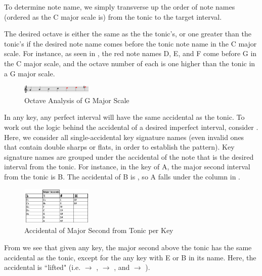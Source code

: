 \documentclass{article}
\begin{document}
To determine note name, we simply transverse up the order of note names (ordered as the C major scale is) from the tonic to the target interval. 

The desired octave is either the same as the the tonic's, or one greater than the tonic's if the desired note name comes before the tonic note name in the C major scale. For instance, as seen in , the red note names D, E, and F come before G in the C major scale, and the octave number of each is one higher than the tonic in a G major scale. 

\vspace{-2mm}
\begin{figure}[h!]
\centering
\includegraphics[width=0.3\textwidth]{images/note_octave_logic}
\caption{\centering Octave Analysis of G Major Scale}
\label{note_octaves}
\vspace{-3mm}
\end{figure}

In any key, any perfect interval will have the same accidental as the tonic. To work out the logic behind the accidental of a desired imperfect interval, consider . Here, we consider all single-accidental key signature names (even invalid ones that contain double sharps or flats, in order to establish the pattern).  Key signature names are grouped under the accidental of the note that is the desired interval from the tonic. For instance, in the key of A\musFlat\;, the major second interval from the tonic is B\musFlat. The accidental of B\musFlat\; is \musFlat, so A\musFlat\; falls under the \musFlat\; column in .

\begin{figure}[h!]
\centering
\includegraphics[width=0.3\textwidth]{images/maj_seconds}
\caption{Accidental of Major Second from Tonic per Key}
\label{maj_seconds}
\vspace{-5mm}
\end{figure}

From  we see that given any key, the major second above the tonic has the same accidental as the tonic, except for the any key with E or B in its name. Here, the accidental is ``lifted"   (i.e. \musFlat $\rightarrow$ \musNatural, \musNatural $\rightarrow$ \musSharp, and \musSharp $\rightarrow$ \musDoubleSharp).
\end{document}

